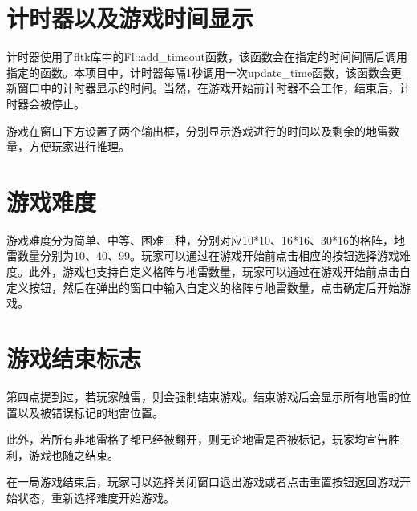 \documentclass{article}
\begin{document}
\begin{CJK}{UTF8}{gbsn}
\section{计时器以及游戏时间显示}

计时器使用了fltk库中的Fl::add\_timeout函数，该函数会在指定的时间间隔后调用指定的函数。本项目中，计时器每隔1秒调用一次update\_time函数，该函数会更新窗口中的计时器显示的时间。当然，在游戏开始前计时器不会工作，结束后，计时器会被停止。

游戏在窗口下方设置了两个输出框，分别显示游戏进行的时间以及剩余的地雷数量，方便玩家进行推理。

\section{游戏难度}

游戏难度分为简单、中等、困难三种，分别对应10*10、16*16、30*16的格阵，地雷数量分别为10、40、99。玩家可以通过在游戏开始前点击相应的按钮选择游戏难度。此外，游戏也支持自定义格阵与地雷数量，玩家可以通过在游戏开始前点击自定义按钮，然后在弹出的窗口中输入自定义的格阵与地雷数量，点击确定后开始游戏。

\section{游戏结束标志}

第四点提到过，若玩家触雷，则会强制结束游戏。结束游戏后会显示所有地雷的位置以及被错误标记的地雷位置。

此外，若所有非地雷格子都已经被翻开，则无论地雷是否被标记，玩家均宣告胜利，游戏也随之结束。

在一局游戏结束后，玩家可以选择关闭窗口退出游戏或者点击重置按钮返回游戏开始状态，重新选择难度开始游戏。


\end{CJK}
\end{document}
